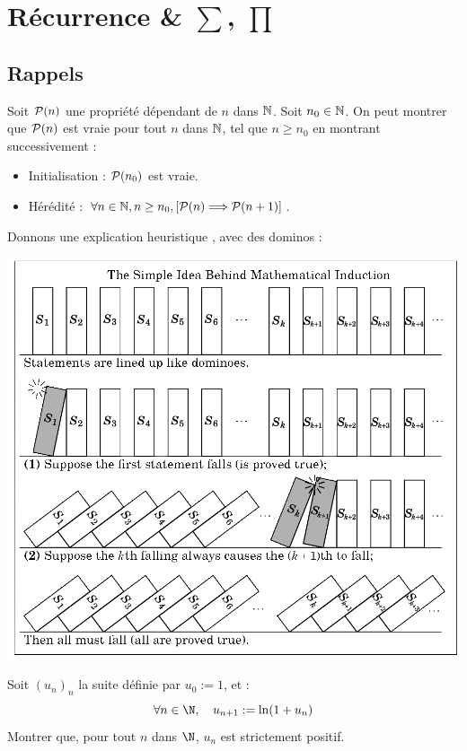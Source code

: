 


\section{Récurrence \& $\sum$, $\prod$ }

\subsection{Rappels}\label{récurrence}


\Rap
{
	Soit $\mathcal{P}(n)$ une propriété dépendant de $n$ dans  $\mathbb{N}$. Soit $n_0 \in \mathbb{N}$. On peut montrer que $\mathcal{P}(n)$ est vraie pour tout $n$ dans $\mathbb{N}$, tel que $n\geq n_0$ en montrant successivement :
	\begin{itemize}
		\item \textcolor{gold2}{Initialisation :} $\mathcal{P}(n_0)$ est vraie.
		\item \textcolor{gold2}{Hérédité :} $\forall n \in \mathbb{N}, n \geq n_0, \left[\mathcal{P}(n) \Longrightarrow \mathcal{P}(n+1)\right]$.
	\end{itemize}
}
Donnons une explication \og heuristique \fg, avec des dominos :
\begin{center}
	\includegraphics[width=1\linewidth]{../Dessins/induction.png}
\end{center}


\begin{exo}
	Soit $(u_n)_n$ la suite définie par $u_0 := 1$, et :
	\[ 
	\forall n \in \N, \quad u_{n+1} := \ln (1+u_n)
	\]
	Montrer que, pour tout $n$ dans $\N$, $u_n$ est strictement positif.
\end{exo}





